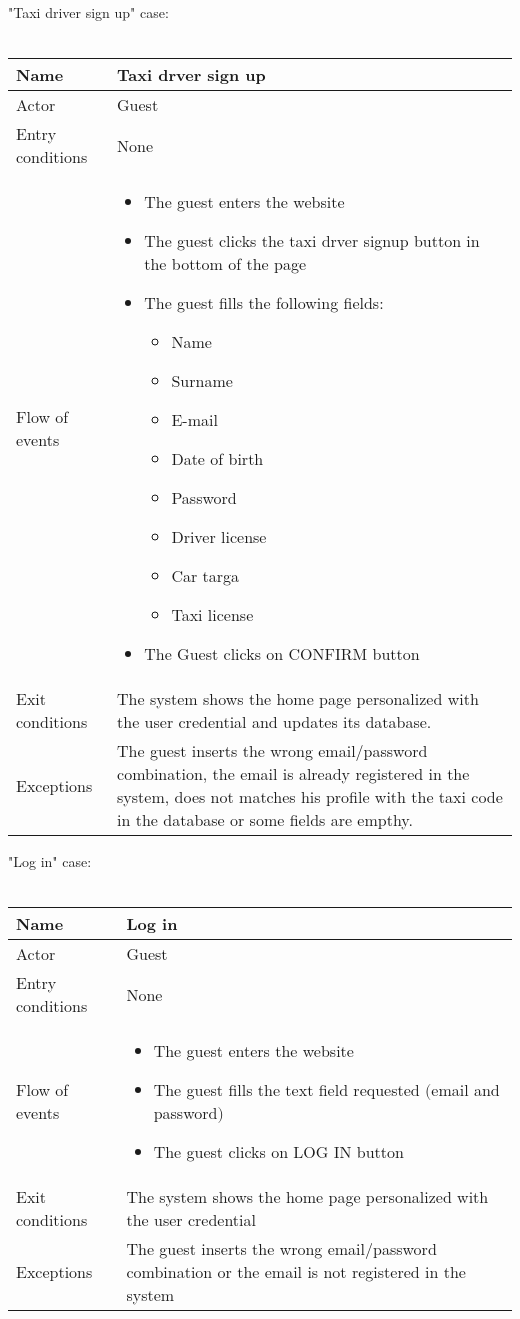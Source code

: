 \newpage
"Taxi driver sign up" case:
\\
\\
\begin {tabular} {|p{3cm}|p{10cm}|}
\hline
Name & Taxi drver sign up\\
\hline
Actor & Guest\\
\hline
Entry conditions & None\\
\hline
Flow of events &
	\begin {itemize}
		\item The guest enters the website
		\item The guest clicks the taxi drver signup button in the bottom of the page
		\item The guest fills the following fields:
		\begin {itemize}
			\item Name
			\item Surname
			\item E-mail
			\item Date of birth
			\item Password
			\item Driver license
			\item Car targa \askpippo
			\item Taxi license
		\end {itemize}
		\item The Guest clicks on CONFIRM button
	\end {itemize}\\
\hline
Exit conditions & The system shows the home page personalized with the user credential and updates its database.\\
\hline
Exceptions & The guest inserts the wrong email/password combination, the email is already registered in the system, does not matches his profile with the taxi
code in the database or some fields are empthy.\\
\hline
\end {tabular}


\newpage
"Log in" case:
\\
\\
\begin{tabular}{|p{3cm}|p{10cm}|}
\hline
Name & Log in\\
\hline
Actor & Guest\\
\hline
Entry conditions & None\\
\hline
Flow of events & \begin{itemize}
					\item The guest enters the website
					\item The guest fills the text field requested $($email and password$)$
					\item The guest clicks on LOG IN button
				\end{itemize}\\
\hline
Exit conditions & The system shows the home page personalized with the user credential\\
\hline
Exceptions & The guest inserts the wrong email/password combination or the email is not registered in the system\\
\hline
\end {tabular}


